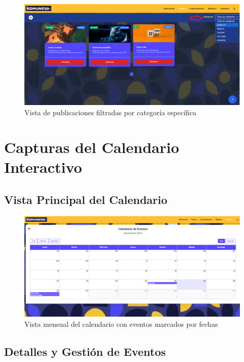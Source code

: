 \begin{figure}[H]
  \centering
  \includegraphics[width=\textwidth]{project/images/6.5.png}
  \caption{Vista de publicaciones filtradas por categoría específica}
  \label{fig:cat-filtradas}
\end{figure}

\section{Capturas del Calendario Interactivo}

\subsection*{Vista Principal del Calendario}

\begin{figure}[H]
  \centering
  \includegraphics[width=\textwidth]{project/images/6.9.png}
  \caption{Vista mensual del calendario con eventos marcados por fechas}
  \label{fig:cal-mensual}
\end{figure}


\subsection*{Detalles y Gestión de Eventos}

